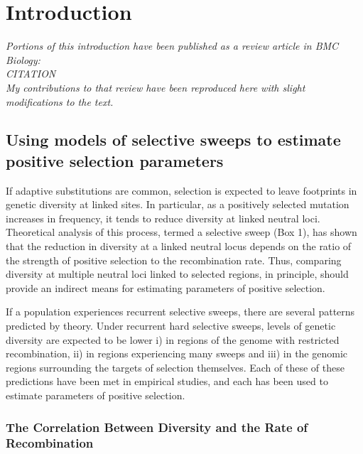 \chapter{Introduction}

\emph{Portions of this introduction have been published as a review article in BMC Biology: \\CITATION\\My contributions to that review have been reproduced here with slight modifications to the text.}

\section{Using models of selective sweeps to estimate positive selection parameters}
 
If adaptive substitutions are common, selection is expected to leave footprints in genetic diversity at linked sites. In particular, as a positively selected mutation increases in frequency, it tends to reduce diversity at linked neutral loci. Theoretical analysis of this process, termed a selective sweep (Box 1), has shown that the reduction in diversity at a linked neutral locus depends on the ratio of the strength of positive selection to the recombination rate. Thus, comparing diversity at multiple neutral loci linked to selected regions, in principle, should provide an indirect means for estimating parameters of positive selection.
 

If a population experiences recurrent selective sweeps, there are several patterns predicted by theory. Under recurrent hard selective sweeps, levels of genetic diversity are expected to be lower i) in regions of the genome with restricted recombination, ii) in regions experiencing many sweeps and iii) in the genomic regions surrounding the targets of selection themselves. Each of these of these predictions have been met in empirical studies, and each has been used to estimate parameters of positive selection.
 
\subsection{The Correlation Between Diversity and the Rate of Recombination}

